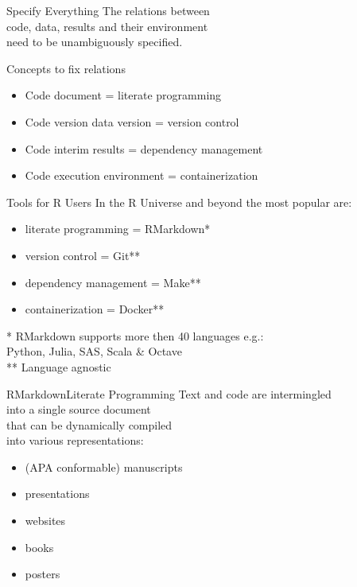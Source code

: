 \documentclass[12pt,t]{beamer}
\begin{document}
{\begin{frame}[c]{Specify Everything}
  \textcolor<3->{lolit}{The relations between\\
  \textcolor<2>{hilit}{code}, \textcolor<2>{hilit}{data}, \textcolor<2>{hilit}{results} and their \textcolor<2>{hilit}{environment}\\
  need to be \textcolor<2>{vhilit}{unambiguously} specified.\\}
  \vspace{10mm}
\end{frame}

\begin{frame}[c]{Concepts to fix relations}
  \begin{itemize}
    \item Code \textemdash{} document = literate programming
    \item Code version \textemdash{} data version = version control
    \item Code \textemdash{} interim results = dependency management
    \item Code \textemdash{} execution environment = containerization
  \end{itemize}
\end{frame}

\begin{frame}[c]{Tools for R Users}
	In the R Universe and beyond the most popular are:
  \begin{itemize}
    \item literate programming = RMarkdown*
    \item version control = Git**
    \item dependency management = Make**
    \item containerization = Docker**
  \end{itemize}
  \vfill
  \textcolor{lolit}{
	* RMarkdown supports more then 40 languages e.g.:\\
	\hspace{10mm}Python, Julia, SAS, Scala \& Octave\\
	** Language agnostic
	}
\end{frame}

\begin{frame}[c]{RMarkdown\textemdash{}Literate Programming}
  Text and code are intermingled\\
  into a single source document\\
  that can be \textcolor{hilit}{dynamically} compiled\\
  into various representations:
  \begin{itemize}
    \item (APA conformable) manuscripts
    \item presentations
    \item websites
    \item books
    \item posters
  \end{itemize}
\end{frame}

}
\end{document}
